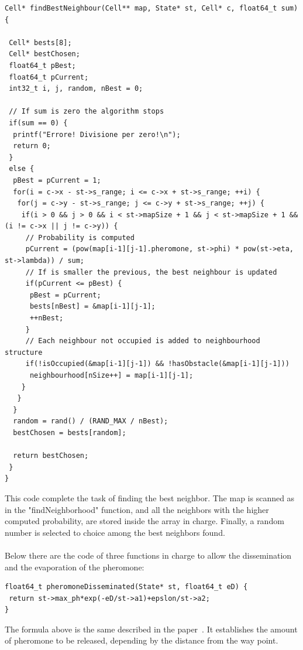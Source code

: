 \documentclass[english]{article}
\begin{document}
\begin{lstlisting}
Cell* findBestNeighbour(Cell** map, State* st, Cell* c, float64_t sum) {

 Cell* bests[8];
 Cell* bestChosen;
 float64_t pBest;
 float64_t pCurrent;
 int32_t i, j, random, nBest = 0;

 // If sum is zero the algorithm stops
 if(sum == 0) {
  printf("Errore! Divisione per zero!\n");
  return 0;
 }
 else {
  pBest = pCurrent = 1;
  for(i = c->x - st->s_range; i <= c->x + st->s_range; ++i) {
   for(j = c->y - st->s_range; j <= c->y + st->s_range; ++j) {
    if(i > 0 && j > 0 && i < st->mapSize + 1 && j < st->mapSize + 1 && (i != c->x || j != c->y)) {
     // Probability is computed
     pCurrent = (pow(map[i-1][j-1].pheromone, st->phi) * pow(st->eta, st->lambda)) / sum;
     // If is smaller the previous, the best neighbour is updated
     if(pCurrent <= pBest) {
      pBest = pCurrent;
      bests[nBest] = &map[i-1][j-1];
      ++nBest;
     }
     // Each neighbour not occupied is added to neighbourhood structure
     if(!isOccupied(&map[i-1][j-1]) && !hasObstacle(&map[i-1][j-1]))
      neighbourhood[nSize++] = map[i-1][j-1];
    }
   }
  }
  random = rand() / (RAND_MAX / nBest);
  bestChosen = bests[random]; 

  return bestChosen;
 }
}
\end{lstlisting}

\noindent This code complete the task of finding the best neighbor. The map is scanned as in the "findNeighborhood" function, and all the neighbors with the higher computed probability, are stored inside the array in charge. Finally, a random number is selected to choice among the best neighbors found.\\
\\Below there are the code of three functions in charge to allow the dissemination and the evaporation of the pheromone:

\begin{lstlisting}
float64_t pheromoneDisseminated(State* st, float64_t eD) {
 return st->max_ph*exp(-eD/st->a1)+epslon/st->a2;
}
\end{lstlisting}

\noindent The formula above is the same described in the paper~\cite{AlgorithmPaper}. It establishes the amount of pheromone to be released, depending by the distance from the way point.
\end{document}
